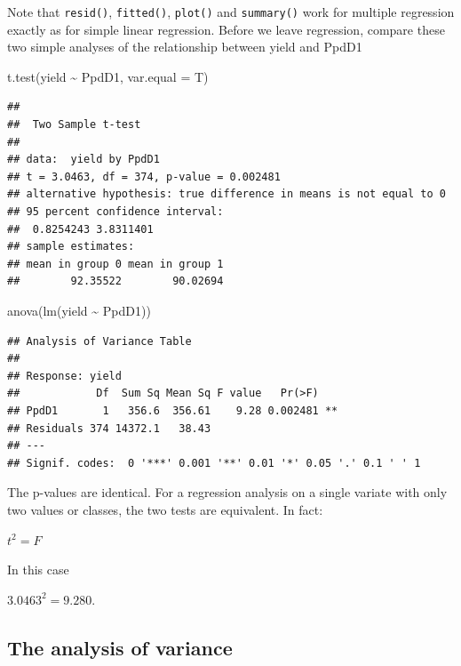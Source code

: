 \documentclass[
]{book}
\newenvironment{Shaded}{\begin{snugshade}}{\end{snugshade}}
\newcommand{\AttributeTok}[1]{\textcolor[rgb]{0.77,0.63,0.00}{#1}}
\newcommand{\FunctionTok}[1]{\textcolor[rgb]{0.00,0.00,0.00}{#1}}
\newcommand{\NormalTok}[1]{#1}
\newcommand{\SpecialCharTok}[1]{\textcolor[rgb]{0.00,0.00,0.00}{#1}}
\begin{document}
Note that \texttt{resid()}, \texttt{fitted()}, \texttt{plot()} and \texttt{summary()} work for multiple regression exactly as for simple linear regression.
Before we leave regression, compare these two simple analyses of the relationship between yield and PpdD1

\begin{Shaded}
\begin{Highlighting}[]
\FunctionTok{t.test}\NormalTok{(yield }\SpecialCharTok{\textasciitilde{}}\NormalTok{ PpdD1, }\AttributeTok{var.equal =}\NormalTok{ T)}
\end{Highlighting}
\end{Shaded}

\begin{verbatim}
## 
##  Two Sample t-test
## 
## data:  yield by PpdD1
## t = 3.0463, df = 374, p-value = 0.002481
## alternative hypothesis: true difference in means is not equal to 0
## 95 percent confidence interval:
##  0.8254243 3.8311401
## sample estimates:
## mean in group 0 mean in group 1 
##        92.35522        90.02694
\end{verbatim}

\begin{Shaded}
\begin{Highlighting}[]
\FunctionTok{anova}\NormalTok{(}\FunctionTok{lm}\NormalTok{(yield }\SpecialCharTok{\textasciitilde{}}\NormalTok{ PpdD1))}
\end{Highlighting}
\end{Shaded}

\begin{verbatim}
## Analysis of Variance Table
## 
## Response: yield
##            Df  Sum Sq Mean Sq F value   Pr(>F)   
## PpdD1       1   356.6  356.61    9.28 0.002481 **
## Residuals 374 14372.1   38.43                    
## ---
## Signif. codes:  0 '***' 0.001 '**' 0.01 '*' 0.05 '.' 0.1 ' ' 1
\end{verbatim}

The p-values are identical. For a regression analysis on a single variate with only two values or classes, the two tests are equivalent. In fact:

\(t^2 = F\)

In this case

\(3.0463^2 = 9.280\).

\hypertarget{the-analysis-of-variance}{%
\subsection{The analysis of variance}\label{the-analysis-of-variance}}
\end{document}
